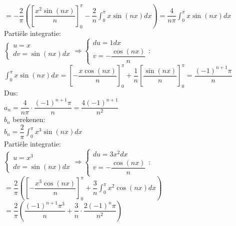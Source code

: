 \documentclass[a4paper]{article}
\begin{document}
$= -\dfrac{2}{\pi}\left(
\left[\dfrac{x^2 \sin(nx)}{n}\right]_0^{\pi}
- \dfrac{2}{n}\displaystyle\int_0^{\pi} x\sin(nx)dx
\right)
= \dfrac{4}{n\pi}\displaystyle\int_0^{\pi} x\sin(nx)dx$\\

Parti\"ele integratie:\\

$\left\{ \begin{array}{l} 
    u = x \\ 
    dv = \sin(nx)  dx 
\end{array} \right.
\Rightarrow
\left\{ \begin{array}{l} 
    du = 1  dx \\ 
    v = -\dfrac{\cos(nx)}{n} 
\end{array} \right.$:\\

$\displaystyle\int_0^{\pi} x\sin(nx)dx
= \left[-\dfrac{x\cos(nx)}{n}\right]_0^{\pi}
+ \dfrac{1}{n}\left[\dfrac{\sin(nx)}{n}\right]_0^{\pi}
= \dfrac{(-1)^{n+1}\pi}{n}$\\

Dus:\\

$a_n = \dfrac{4}{n\pi} \cdot \dfrac{(-1)^{n+1}\pi}{n} = \dfrac{4(-1)^{n+1}}{n^2}$\\

$b_n$ berekenen:\\

$b_n = \dfrac{2}{\pi}\displaystyle\int_0^{\pi} x^3\sin(nx)dx$\\

Parti\"ele integratie:\\

$\left\{ \begin{array}{l} 
    u = x^3 \\ 
    dv = \sin(nx)  dx 
\end{array} \right.
\Rightarrow
\left\{ \begin{array}{l} 
    du = 3x^2  dx \\ 
    v = -\dfrac{\cos(nx)}{n} 
\end{array} \right.$:\\

$= \dfrac{2}{\pi}\left(
\left[-\dfrac{x^3\cos(nx)}{n}\right]_0^{\pi}
+ \dfrac{3}{n}\displaystyle\int_0^{\pi} x^2\cos(nx)dx
\right)$\\

$= \dfrac{2}{\pi}\left(
\dfrac{(-1)^{n+1}\pi^3}{n}
+ \dfrac{3}{n} \cdot \dfrac{2(-1)^n\pi}{n^2}
\right)$\\
\end{document}
